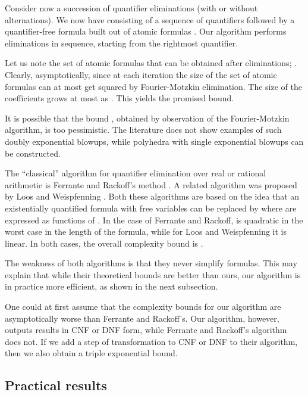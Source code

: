 Consider now a succession of quantifier eliminations (with or without alternations). We now have  consisting of a sequence of quantifiers followed by a quantifier-free formula built out of atomic formulas . Our algorithm performs eliminations in sequence, starting from the rightmost quantifier.

Let us note  the set of atomic formulas that can be obtained after  eliminations; . Clearly,  asymptotically, since at each iteration the size of the set of atomic formulas can at most get squared by Fourier-Motzkin elimination. The size of the coefficients grows at most as . This yields the promised bound.

It is possible that the bound , obtained by observation of the Fourier-Motzkin algorithm, is too pessimistic. The literature does not show examples of such doubly exponential blowups, while polyhedra with single exponential blowups can be constructed.









The ``classical'' algorithm for quantifier elimination over real or rational arithmetic is Ferrante and Rackoff's method \cite{FerranteRackoff75}\cite[\S 7.3]{BradleyManna07}\cite[\S 4.2]{NipkowIJCAR08}. A related algorithm was proposed by Loos and Weispfenning \cite{LoosWeispfenning93}\cite[\S 4.4]{NipkowIJCAR08}. Both these algorithms are based on the idea that an existentially quantified formula  with free variables  can be replaced by  where  are expressed as functions of . In the case of Ferrante and Rackoff,  is quadratic in the worst case in the length of the formula, while for Loos and Weispfenning it is linear. In both cases, the overall complexity bound is .

The weakness of both algorithms is that they never simplify formulas. This may explain that while their theoretical bounds are better than ours, our algorithm is in practice more efficient, as shown in the next subsection.

One could at first assume that the complexity bounds for our algorithm are asymptotically worse than Ferrante and Rackoff's. Our algorithm, however, outputs results in CNF or DNF form, while Ferrante and Rackoff's algorithm does not. If we add a step of transformation to CNF or DNF to their algorithm, then we also obtain a triple exponential bound.

\subsection{Practical results}
\label{part:benchmarks}

